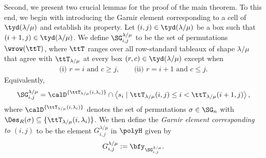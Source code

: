 \documentclass[12pt, reqno]{amsart}
\theoremstyle{plain}
\theoremstyle{definition}
\numberwithin{equation}{section}
\numberwithin{figure}{section}
\numberwithin{table}{section}
\begin{document}
Second, we present two crucial lemmas for the proof of the main theorem.
To this end, we begin with introducing  the Garnir element corresponding to a cell of $\tyd(\lambda/\mu)$ and establish its property.
Let $(i,j)\in \tyd(\lambda/\mu)$ be a box such that $(i+1,j)\in \tyd(\lambda/\mu)$.
We define $\SG^{\lambda/\mu}_{i,j}$ to be the set of permutations $\wrow(\ttT)$, where $\ttT$ ranges over all row-standard tableaux of shape $\lambda/\mu$ that agree with $\ttT_{\lambda/\mu}$ at every box $(r,c)\in \tyd(\lambda/\mu)$ except when
\begin{align}\label{eq: Garnir belt}
\text{(i) } r=i \text{ and } c\ge j,
\qquad
\text{(ii) } r=i+1 \text{ and } c\le j.
\end{align}
Equivalently, 
\begin{align}\label{eq: Garnir permutations alternating def}
\SG^{\lambda/\mu}_{i,j}
= 
\calD^{\{\ttT_{\lambda / \mu}(i,\lambda_i)\}}
\cap 
\left\langle s_i \mid \ttT_{\lambda / \mu}(i,j) \le i < \ttT_{\lambda / \mu}(i+1,j) \right\rangle,
\end{align}
where $\calD^{\{\ttT_{\lambda / \mu}(i,\lambda_i)\}}$ denotes the set of permutations $\sigma \in \SG_n$ with $\Des_R(\sigma) \subseteq \{\ttT_{\lambda / \mu}(i,\lambda_i)\}$.
We then define the \emph{Garnir element corresponding to $(i,j)$} to be the element $G^{\lambda/\mu}_{i,j}$ in $\polyH$ given by
\[
G^{\lambda/\mu}_{i,j} := \bfy_{\SG^{\lambda/\mu}_{i,j}}.
\]
\end{document}
